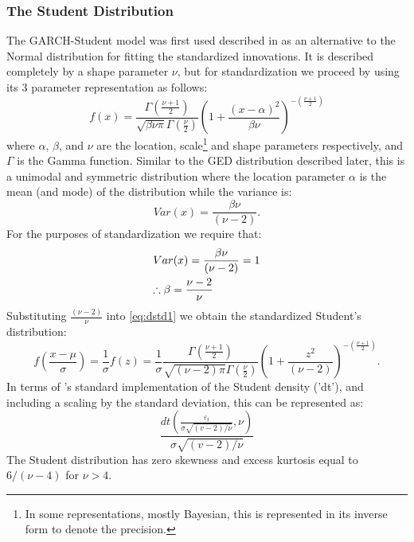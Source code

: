 \subsubsection{The Student Distribution}\label{tdist}
The GARCH-Student model was first used described in \citet{Bollerslev2} as an
alternative to the Normal distribution for fitting the standardized innovations.
It is described completely by a shape parameter $\nu$, but for standardization
we proceed by using its 3 parameter representation as follows:
\begin{equation}\label{eq:dstd1}
f\left( x \right) = \frac{{\Gamma \left( {\frac{{\nu  + 1}}
{2}} \right)}}
{{\sqrt {\beta \nu \pi } \Gamma \left( {\frac{\nu }
{2}} \right)}}{\left( {1 + \frac{{{{\left( {x - \alpha } \right)}^2}}}
{{\beta \nu }}} \right)^{ - \left( {\frac{{\nu  + 1}}
{2}} \right)}}
\end{equation}
where $\alpha$, $\beta$, and $\nu$ are the location, scale\footnote{In some representations,
mostly Bayesian, this is represented in its inverse form to denote the precision.}
and shape parameters respectively, and $\Gamma$ is the Gamma function. Similar to
the GED distribution described later, this is a unimodal and symmetric distribution
where the location parameter $\alpha$ is the mean (and mode) of the distribution
while the variance is:
\begin{equation}\label{eq:dstd2}
Var\left( x \right) = \frac{{\beta \nu }}{{\left( {\nu  - 2} \right)}}.
\end{equation}
For the purposes of standardization we require that:
\begin{equation}\label{eq:dstd3}
\begin{gathered}
  Var(x) = \frac{{\beta \nu }}
{{\left( {\nu  - 2} \right)}} = 1 \hfill \\
  \therefore \beta  = \frac{{\nu  - 2}}
{\nu } \hfill \\
\end{gathered}
\end{equation}
Substituting $\frac{(\nu- 2)}{\nu }$ into \ref{eq:dstd1} we obtain the
standardized Student's distribution:
\begin{equation}\label{eq:dstd4}
f\left( {\frac{{x - \mu }}{\sigma }} \right) = \frac{1}
{\sigma }f\left( z \right) = \frac{1}
{\sigma }\frac{{\Gamma \left( {\frac{{\nu  + 1}}
{2}} \right)}}{{\sqrt {\left( {\nu  - 2} \right)\pi } \Gamma \left( {\frac{\nu }
{2}} \right)}}{\left( {1 + \frac{{{z^2}}}
{{\left( {\nu  - 2} \right)}}} \right)^{ - \left( {\frac{{\nu  + 1}}
{2}} \right)}}.
\end{equation}
In terms of \verb@R@'s standard implementation of the Student density ('dt'),
and including a scaling by the standard deviation, this can be represented as:
\begin{equation}\label{eq:dstd5}
\frac{{dt\left( {\frac{{{\varepsilon _t}}}
{{\sigma \sqrt {\left( {v - 2} \right)/\nu } }},\nu } \right)}}
{{\sigma \sqrt {\left( {v - 2} \right)/\nu } }}
\end{equation}
The Student distribution has zero skewness and excess kurtosis equal to
$6/(\nu  - 4)$ for $\nu > 4$.
